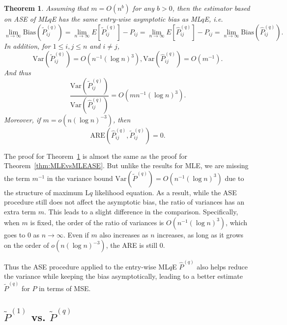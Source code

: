 \documentclass[a4paper]{article}
\newtheorem{theorem}[fact]{Theorem}
\newtheorem{remark}[fact]{Remark}
\renewcommand{\hat}{\widehat}
\begin{document}
\begin{theorem}
\label{thm:MLqEvsMLqEASE}
Assuming that $m = O(n^b)$ for any $b > 0$, then the estimator based on ASE of ML$q$E has the same entry-wise asymptotic bias as ML$q$E, i.e.\
\[
	\lim_{n \to \infty} \mathrm{Bias}(\widetilde{P}_{ij}^{(q)}) = \lim_{n \to \infty} E[\widetilde{P}_{ij}^{(q)}] - P_{ij} = \lim_{n \to \infty} E[\hat{P}^{(q)}_{ij}] - P_{ij}
    = \lim_{n \to \infty} \mathrm{Bias}(\hat{P}_{ij}^{(q)}).
\]
In addition, for $1 \le i, j \le n$ and $i \ne j$,
\[
	\mathrm{Var}(\widetilde{P}_{ij}^{(q)}) = O(n^{-1} (\log n)^3),
	\mathrm{Var}(\hat{P}_{ij}^{(q)}) = O(m^{-1}).
\]
And thus
\[
	\frac{\mathrm{Var}(\widetilde{P}_{ij}^{(q)})}{\mathrm{Var}(\hat{P}_{ij}^{(q)})}
    = O(m n^{-1} (\log n)^3).
\]
Moreover, if $m = o(n (\log n)^{-3})$, then
\[
	\mathrm{ARE}(\hat{P}_{ij}^{(q)}, \widetilde{P}_{ij}^{(q)}) = 0.
\]
\end{theorem}

The proof for Theorem~\ref{thm:MLqEvsMLqEASE} is almost the same as the proof for Theorem~\ref{thm:MLEvsMLEASE}. But unlike the results for MLE, we are missing the term $m^{-1}$ in the variance bound $\mathrm{Var}(\widetilde{P}^{(q)}) = O(n^{-1} (\log n)^3)$ due to the structure of maximum L$q$ likelihood equation. As a result, while the ASE procedure still does not affect the asymptotic bias, the ratio of variances has an extra term $m$. This leads to a slight difference in the comparison. Specifically, when $m$ is fixed, the order of the ratio of variances is $O(n^{-1} (\log n)^3)$, which goes to 0 as $n \to \infty$. Even if $m$ also increases as $n$ increases, as long as it grows on the order of $o(n (\log n)^{-3})$, the ARE is still 0. 

Thus the ASE procedure applied to the entry-wise ML$q$E $\hat{P}^{(q)}$ also helps reduce the variance while keeping the bias asymptotically, leading to a better estimate $\widetilde{P}^{(q)}$ for $P$ in terms of MSE.


\subsection{$\widetilde{P}^{(1)}$ vs. $\widetilde{P}^{(q)}$}
\end{document}
